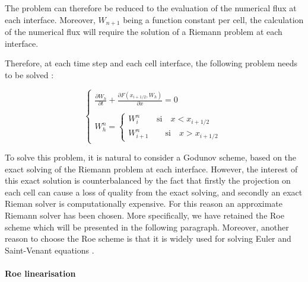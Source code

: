 \vspace{0.5cm}

The problem can therefore be reduced to the evaluation of the numerical flux at each interface. Moreover, $W_{n+1}$ being a function constant per cell, the calculation of the numerical flux will require the solution of a Riemann problem at each interface.

\vspace{0.5cm}

Therefore, at each time step and each cell interface, the following problem needs to be solved :

\begin{equation}
 \label{sysW}
 \left \lbrace
  \begin{array}{l}
   \frac{\partial W_h}{\partial t} + \frac{\partial F(x_{i+1/2},W_h)}{\partial x} = 0 \\
   \\
   W_{h}^n = \left \lbrace
             \begin{array}{l}
               W_{i}^n \qquad \mbox{si} \quad x < x_{i+1/2} \\
               W_{i+1}^n \qquad \mbox{si} \quad x > x_{i+1/2}
             \end{array}
             \right.
  \end{array}
 \right.
\end{equation}

\vspace{0.5cm}

To solve this problem, it is natural to consider a Godunov scheme, based on the exact solving of the Riemann problem at each interface. However, the interest of this exact solution is counterbalanced by the fact that firstly the projection on each cell can cause a loss of quality from the exact solving, and secondly an exact Rieman solver is computationally expensive. For this reason an approximate Riemann solver has been chosen. More specifically, we have retained the Roe scheme which will be presented in the following paragraph. Moreover, another reason to choose the Roe scheme is that it is widely used for solving Euler and Saint-Venant equations \cite{PAQUIER95}\cite{VAZQUEZ94}\cite{AMBROSI95}\cite{MONTHE97}.

\paragraph{Roe linearisation\\}

\hspace*{1cm}

